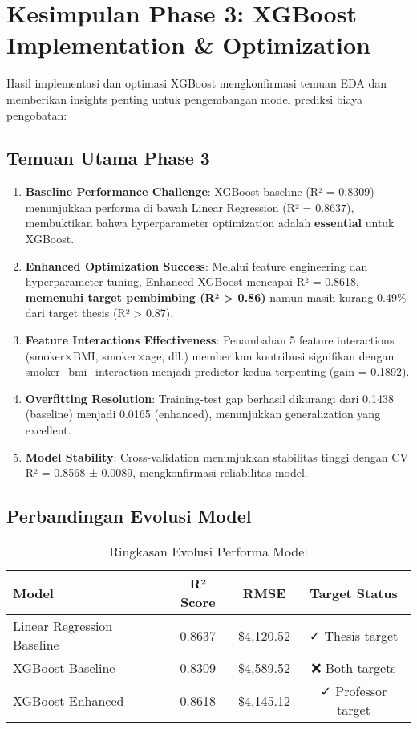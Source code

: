 \section{Kesimpulan Phase 3: XGBoost Implementation \& Optimization}
\label{sec:kesimpulan-phase3}

Hasil implementasi dan optimasi XGBoost mengkonfirmasi temuan EDA dan memberikan insights penting untuk pengembangan model prediksi biaya pengobatan:

\subsection{Temuan Utama Phase 3}
\begin{enumerate}
    \item \textbf{Baseline Performance Challenge}: XGBoost baseline (R² = 0.8309) menunjukkan performa di bawah Linear Regression (R² = 0.8637), membuktikan bahwa hyperparameter optimization adalah \textbf{essential} untuk XGBoost.

    \item \textbf{Enhanced Optimization Success}: Melalui feature engineering dan hyperparameter tuning, Enhanced XGBoost mencapai R² = 0.8618, \textbf{memenuhi target pembimbing (R² > 0.86)} namun masih kurang 0.49\% dari target thesis (R² > 0.87).

    \item \textbf{Feature Interactions Effectiveness}: Penambahan 5 feature interactions (smoker×BMI, smoker×age, dll.) memberikan kontribusi signifikan dengan smoker\_bmi\_interaction menjadi predictor kedua terpenting (gain = 0.1892).

    \item \textbf{Overfitting Resolution}: Training-test gap berhasil dikurangi dari 0.1438 (baseline) menjadi 0.0165 (enhanced), menunjukkan generalization yang excellent.

    \item \textbf{Model Stability}: Cross-validation menunjukkan stabilitas tinggi dengan CV R² = 0.8568 ± 0.0089, mengkonfirmasi reliabilitas model.
\end{enumerate}

\subsection{Perbandingan Evolusi Model}
\begin{table}[H]
\centering
\caption{Ringkasan Evolusi Performa Model}
\label{tab:model-evolution-summary}
\begin{tabular}{|l|c|c|c|}
\hline
\textbf{Model} & \textbf{R² Score} & \textbf{RMSE} & \textbf{Target Status} \\
\hline
Linear Regression Baseline & 0.8637 & \$4,120.52 & ✓ Thesis target \\
XGBoost Baseline & 0.8309 & \$4,589.52 & ❌ Both targets \\
XGBoost Enhanced & 0.8618 & \$4,145.12 & ✓ Professor target \\
\hline
\end{tabular}
\end{table}

